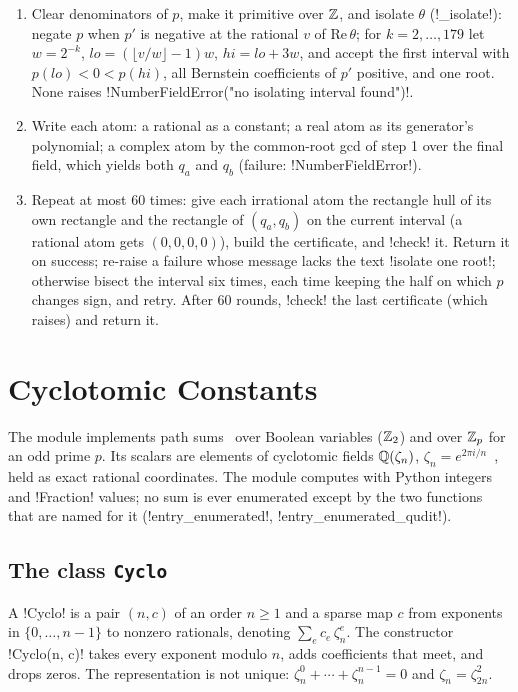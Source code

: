 \begin{algorithm}
\begin{enumerate}
\item Clear denominators of $p$, make it primitive over $\mathbb{Z}$, and isolate $\theta$ (\py!_isolate!): negate $p$ when $p'$ is negative at the rational $v$ of $\mathrm{Re}\,\theta$; for $k=2,\ldots,179$ let $w=2^{-k}$, $\mathit{lo}=(\lfloor v/w\rfloor-1)w$, $\mathit{hi}=\mathit{lo}+3w$, and accept the first interval with $p(\mathit{lo})<0<p(\mathit{hi})$, all Bernstein coefficients of $p'$ positive, and one root. None raises \py!NumberFieldError("no isolating interval found")!.
\item Write each atom: a rational as a constant; a real atom as its generator's polynomial; a complex atom by the common-root gcd of step 1 over the final field, which yields both $q_a$ and $q_b$ (failure: \py!NumberFieldError!).
\item Repeat at most 60 times: give each irrational atom the rectangle hull of its own rectangle and the rectangle of $(q_a,q_b)$ on the current interval (a rational atom gets $(0,0,0,0)$), build the certificate, and \py!check! it. Return it on success; re-raise a failure whose message lacks the text \code!isolate one root!; otherwise bisect the interval six times, each time keeping the half on which $p$ changes sign, and retry. After 60 rounds, \py!check! the last certificate (which raises) and return it.
\end{enumerate}
\end{algorithm}

\section{Cyclotomic Constants}\label{sec:algebra-cyclo}

The module  implements path sums~\cite{amy2018pathsums} over Boolean variables ($\mathbb{Z}_{2}$) and over $\mathbb{Z}_{p}$ for an odd prime $p$. Its scalars are elements of cyclotomic fields $\mathbb{Q}(\zeta_n)$, $\zeta_n=e^{2\pi i/n}$~\cite{washington1997cyclotomic}, held as exact rational coordinates. The module computes with Python integers and \py!Fraction! values; no sum is ever enumerated except by the two functions that are named for it (\py!entry_enumerated!, \py!entry_enumerated_qudit!).

\subsection{The class \texttt{Cyclo}}

\begin{definition}\label{def:algebra-cyclo}
A \py!Cyclo! is a pair $(n,c)$ of an order $n\ge1$ and a sparse map $c$ from exponents in $\{0,\ldots,n-1\}$ to nonzero rationals, denoting $\sum_e c_e\,\zeta_n^e$. The constructor \py!Cyclo(n, c)! takes every exponent modulo $n$, adds coefficients that meet, and drops zeros. The representation is not unique: $\zeta_n^0+\cdots+\zeta_n^{n-1}=0$ and $\zeta_n=\zeta_{2n}^2$.
\end{definition}

